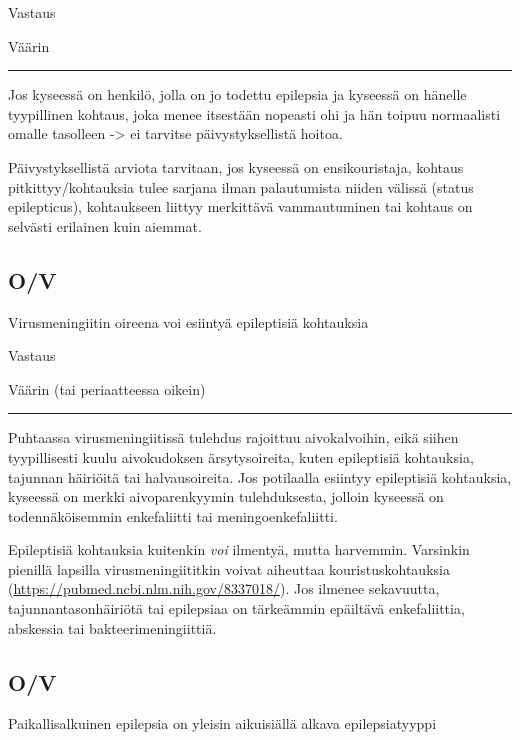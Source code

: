 \documentclass[
]{book}
\begin{document}
Vastaus

Väärin

\begin{center}\rule{0.5\linewidth}{0.5pt}\end{center}

Jos kyseessä on henkilö, jolla on jo todettu epilepsia ja kyseessä on hänelle tyypillinen kohtaus, joka menee itsestään nopeasti ohi ja hän toipuu normaalisti omalle tasolleen -\textgreater{} ei tarvitse päivystyksellistä hoitoa.

Päivystyksellistä arviota tarvitaan, jos kyseessä on ensikouristaja, kohtaus pitkittyy/kohtauksia tulee sarjana ilman palautumista niiden välissä (status epilepticus), kohtaukseen liittyy merkittävä vammautuminen tai kohtaus on selvästi erilainen kuin aiemmat.

\subsection{O/V}\label{ov-6}

Virusmeningiitin oireena voi esiintyä epileptisiä kohtauksia

Vastaus

Väärin (tai periaatteessa oikein)

\begin{center}\rule{0.5\linewidth}{0.5pt}\end{center}

Puhtaassa virusmeningiitissä tulehdus rajoittuu aivokalvoihin, eikä siihen tyypillisesti kuulu aivokudoksen ärsytysoireita, kuten epileptisiä kohtauksia, tajunnan häiriöitä tai halvausoireita. Jos potilaalla esiintyy epileptisiä kohtauksia, kyseessä on merkki aivoparenkyymin tulehduksesta, jolloin kyseessä on todennäköisemmin enkefaliitti tai meningoenkefaliitti.

Epileptisiä kohtauksia kuitenkin \emph{voi} ilmentyä, mutta harvemmin. Varsinkin pienillä lapsilla virusmeningiititkin voivat aiheuttaa kouristuskohtauksia (\url{https://pubmed.ncbi.nlm.nih.gov/8337018/}). Jos ilmenee sekavuutta, tajunnantasonhäiriötä tai epilepsiaa on tärkeämmin epäiltävä enkefaliittia, abskessia tai bakteerimeningiittiä.

\subsection{O/V}\label{ov-7}

Paikallisalkuinen epilepsia on yleisin aikuisiällä alkava epilepsiatyyppi
\end{document}
